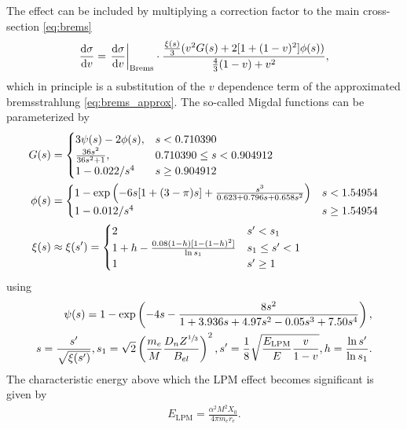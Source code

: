 The effect can be included by multiplying a correction factor to the main cross-section \eqref{eq:brems}
\begin{align} \label{eq:brems_lpm}
\frac{\mathrm{d} \sigma}{\mathrm{d} v} =
    \left. \frac{\mathrm{d} \sigma}{\mathrm{d} v} \right|_{\text{Brems}} \cdot
    \frac{\frac{\xi(s)}{3} (v^2 G(s) + 2[1 + (1-v)^2]\phi(s))}{\frac43(1-v) + v^2},
\end{align}
which in principle is a substitution of the $v$ dependence term of the approximated bremsstrahlung \eqref{eq:brems_approx}.
The so-called Migdal functions can be parameterized by \cite{Stanev82}
\begin{subequations}
\begin{align}
G(s) &=
    \begin{cases}
        3 \psi(s) - 2\phi(s), & s < 0.710390 \\
        \frac{36s^2}{36s^2 + 1}, & 0.710390 \leq s < 0.904912 \\
        1 - 0.022/s^4 & s \geq 0.904912
    \end{cases}
\\
\phi(s) &=
    \begin{cases}
        1 - \exp \left( -6s[1 + (3 - \pi)s] + \frac{s^3}{0.623 + 0.796s + 0.658s^2} \right) & s < 1.54954 \\
        1 - 0.012/s^4 & s \geq 1.54954
    \end{cases}
\\
\xi(s) &\approx \xi(s') = 
    \begin{cases}
        2 & s' < s_1 \\
        1 + h - \frac{0.08(1-h)[1-(1-h)^2]}{\operatorname{ln} s_1} & s_1 \leq s' < 1 \\
        1 & s' \geq 1 \\
    \end{cases}
\end{align}
\end{subequations}
using
\begin{align}
    \psi(s) = 1 - \exp \left( -4s - \frac{8s^2}{1 + 3.936s + 4.97s^2 - 0.05s^3 + 7.50s^4} \right),
    \\
    s = \frac{s'}{\sqrt{\xi(s')}}, s_1 = \sqrt{2} \left(\frac{m_e}{M} \frac{D_nZ^{\sfrac13}}{B_{el}}\right)^2, s' = \frac{1}{8}\sqrt{\frac{E_{\text{LPM}}}{E} \frac{v}{1-v}}, h = \frac{\operatorname{ln} s'}{\operatorname{ln} s_1}.
\end{align}
The characteristic energy above which the LPM effect becomes significant is given by
\begin{align}
    E_{\text{LPM}} = \frac{\alpha^2 M^2 X_0}{4 \pi m_e r_e}.
\end{align}
